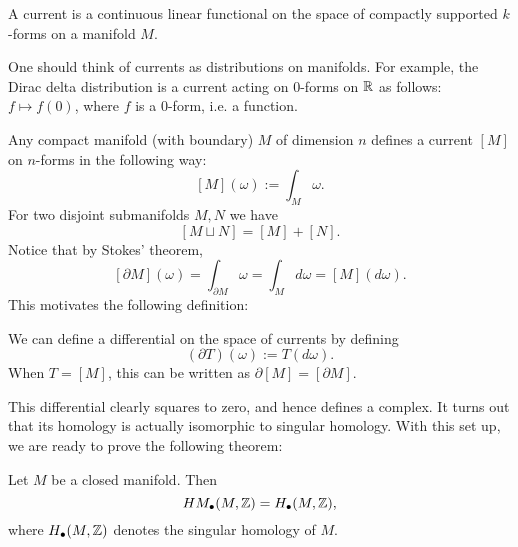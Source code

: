 \begin{definition}[Current]
    A current is a continuous linear functional on the space of compactly supported $k$-forms on a manifold $M$.
\end{definition}
\begin{remark}
    One should think of currents as distributions on manifolds. For example, the Dirac delta distribution is a current acting on $0$-forms on $\R$ as follows: $f \mapsto  f(0)$, where $f$ is a $0$-form, i.e. a function.
\end{remark}
\begin{eg}
    Any compact manifold (with boundary) $M$ of dimension $n$ defines a current $[M]$ on $n$-forms in the following way:
    \[
        [M](\omega) := \int_M \omega
    .\] 
    For two disjoint submanifolds $M, N$ we have
    \[
        [M \sqcup N] = [M] + [N]
    .\] 
    Notice that by Stokes' theorem,
    \[
        [\partial M](\omega) = \int_{\partial M} \omega = \int_M d \omega = [M](d \omega).
    \] 
    This motivates the following definition:
\end{eg}
\begin{definition}
    We can define a differential on the space of currents by defining
    \[
        (\partial T) (\omega) := T(d \omega)
    .\] 
    When $T = [M]$, this can be written as $\partial [M] = [\partial M]$. 
\end{definition}
This differential clearly squares to zero, and hence defines a complex.
It turns out that its homology is actually isomorphic to singular homology.
With this set up, we are ready to prove the following theorem:

\begin{theorem}
    Let $M$ be a closed manifold. Then
     \[
         \HMf[\bul]{M, \Z} = H_{\bul}(M, \Z)
    ,\] 
    where $H_{\bul}(M, \Z)$ denotes the singular homology of $M$.
\end{theorem}

